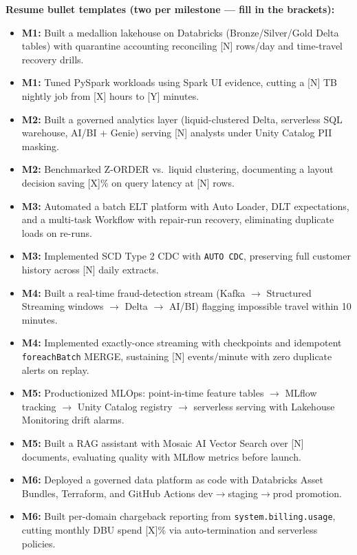 \documentclass[11pt, a4paper]{article}
\begin{document}
\noindent\textbf{Resume bullet templates (two per milestone --- fill in the brackets):}
\begin{itemize}[label=-, itemsep=1pt]
    \item \textbf{M1:} Built a medallion lakehouse on Databricks (Bronze/Silver/Gold Delta tables) with quarantine accounting reconciling [N] rows/day and time-travel recovery drills.
    \item \textbf{M1:} Tuned PySpark workloads using Spark UI evidence, cutting a [N] TB nightly job from [X] hours to [Y] minutes.
    \item \textbf{M2:} Built a governed analytics layer (liquid-clustered Delta, serverless SQL warehouse, AI/BI + Genie) serving [N] analysts under Unity Catalog PII masking.
    \item \textbf{M2:} Benchmarked Z-ORDER vs.\ liquid clustering, documenting a layout decision saving [X]\% on query latency at [N] rows.
    \item \textbf{M3:} Automated a batch ELT platform with Auto Loader, DLT expectations, and a multi-task Workflow with repair-run recovery, eliminating duplicate loads on re-runs.
    \item \textbf{M3:} Implemented SCD Type 2 CDC with \texttt{AUTO CDC}, preserving full customer history across [N] daily extracts.
    \item \textbf{M4:} Built a real-time fraud-detection stream (Kafka $\rightarrow$ Structured Streaming windows $\rightarrow$ Delta $\rightarrow$ AI/BI) flagging impossible travel within 10 minutes.
    \item \textbf{M4:} Implemented exactly-once streaming with checkpoints and idempotent \texttt{foreachBatch} MERGE, sustaining [N] events/minute with zero duplicate alerts on replay.
    \item \textbf{M5:} Productionized MLOps: point-in-time feature tables $\rightarrow$ MLflow tracking $\rightarrow$ Unity Catalog registry $\rightarrow$ serverless serving with Lakehouse Monitoring drift alarms.
    \item \textbf{M5:} Built a RAG assistant with Mosaic AI Vector Search over [N] documents, evaluating quality with MLflow metrics before launch.
    \item \textbf{M6:} Deployed a governed data platform as code with Databricks Asset Bundles, Terraform, and GitHub Actions dev$\rightarrow$staging$\rightarrow$prod promotion.
    \item \textbf{M6:} Built per-domain chargeback reporting from \texttt{system.billing.usage}, cutting monthly DBU spend [X]\% via auto-termination and serverless policies.
\end{itemize}
\end{document}
